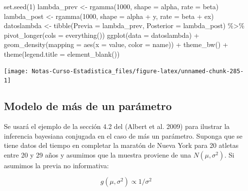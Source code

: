 \documentclass[
  12pt,
]{book}
\newenvironment{Shaded}{\begin{snugshade}}{\end{snugshade}}
\newcommand{\AttributeTok}[1]{\textcolor[rgb]{0.77,0.63,0.00}{#1}}
\newcommand{\DecValTok}[1]{\textcolor[rgb]{0.00,0.00,0.81}{#1}}
\newcommand{\FunctionTok}[1]{\textcolor[rgb]{0.00,0.00,0.00}{#1}}
\newcommand{\NormalTok}[1]{#1}
\newcommand{\OtherTok}[1]{\textcolor[rgb]{0.56,0.35,0.01}{#1}}
\newcommand{\SpecialCharTok}[1]{\textcolor[rgb]{0.00,0.00,0.00}{#1}}
\begin{document}
\begin{Shaded}
\begin{Highlighting}[]
\FunctionTok{set.seed}\NormalTok{(}\DecValTok{1}\NormalTok{)}
\NormalTok{lambda\_prev }\OtherTok{\textless{}{-}} \FunctionTok{rgamma}\NormalTok{(}\DecValTok{1000}\NormalTok{, }\AttributeTok{shape =}\NormalTok{ alpha, }\AttributeTok{rate =}\NormalTok{ beta)}
\NormalTok{lambda\_post }\OtherTok{\textless{}{-}} \FunctionTok{rgamma}\NormalTok{(}\DecValTok{1000}\NormalTok{, }\AttributeTok{shape =}\NormalTok{ alpha }\SpecialCharTok{+}\NormalTok{ y, }\AttributeTok{rate =}\NormalTok{ beta }\SpecialCharTok{+}
\NormalTok{    ex)}
\NormalTok{datoslambda }\OtherTok{\textless{}{-}} \FunctionTok{tibble}\NormalTok{(}\AttributeTok{Previa =}\NormalTok{ lambda\_prev, }\AttributeTok{Posterior =}\NormalTok{ lambda\_post) }\SpecialCharTok{\%\textgreater{}\%}
    \FunctionTok{pivot\_longer}\NormalTok{(}\AttributeTok{cols =} \FunctionTok{everything}\NormalTok{())}
\FunctionTok{ggplot}\NormalTok{(}\AttributeTok{data =}\NormalTok{ datoslambda) }\SpecialCharTok{+} \FunctionTok{geom\_density}\NormalTok{(}\AttributeTok{mapping =} \FunctionTok{aes}\NormalTok{(}\AttributeTok{x =}\NormalTok{ value,}
    \AttributeTok{color =}\NormalTok{ name)) }\SpecialCharTok{+} \FunctionTok{theme\_bw}\NormalTok{() }\SpecialCharTok{+} \FunctionTok{theme}\NormalTok{(}\AttributeTok{legend.title =} \FunctionTok{element\_blank}\NormalTok{())}
\end{Highlighting}
\end{Shaded}

\begin{center}\texttt{[image: Notas-Curso-Estadistica\_files/figure-latex/unnamed-chunk-285-1]} \end{center}

\hypertarget{modelo-de-muxe1s-de-un-paruxe1metro}{%
\subsection{Modelo de más de un
parámetro}\label{modelo-de-muxe1s-de-un-paruxe1metro}}

Se usará el ejemplo de la sección 4.2 del (Albert et al. 2009) para
ilustrar la inferencia bayesiana conjugada en el caso de más un
parámetro. Suponga que se tiene datos del tiempo en completar la maratón
de Nueva York para 20 atletas entre 20 y 29 años y asumimos que la
muestra proviene de una \(N(\mu,\sigma^2)\). Si asumimos la previa no
informativa:

\[g(\mu,\sigma^2) \propto 1/\sigma^2\]
\end{document}
